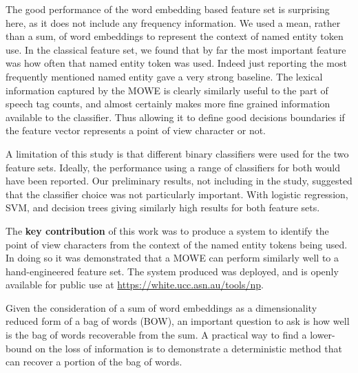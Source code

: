 \documentclass{book}
\begin{document}
The good performance of the word embedding based feature set is surprising here, as it does not include any frequency information.
We used a mean, rather than a sum, of word embeddings to represent the context of named entity token use.
In the classical feature set, we found that by far the most important feature was how often that named entity token was used.
Indeed just reporting the most frequently mentioned named entity gave a very strong baseline.
The lexical information captured by the MOWE is clearly similarly useful to the part of speech tag counts, and almost certainly makes more fine grained information available to the classifier.
Thus allowing it to define good decisions boundaries if the feature vector represents a point of view character or not.


A limitation of this study is that different binary classifiers were used for the two feature sets.
Ideally, the performance using a range of classifiers for both would have been reported.
Our preliminary results, not including in the study, suggested that the classifier choice was not particularly important.
With logistic regression, SVM, and decision trees giving similarly high results for both feature sets.
 



The \textbf{key contribution} of this work was to produce a system to identify the point of view characters from the context of the named entity tokens being used.
In doing so it was demonstrated that a MOWE can perform similarly well to a hand-engineered feature set.
The system produced was deployed, and is openly available for public use at \url{https://white.ucc.asn.au/tools/np}.


Given the consideration of a sum of word embeddings as a dimensionality reduced form of a bag of words (BOW),
an important question to ask is how well is the bag of words recoverable from the sum.
A practical way to find a lower-bound  on the loss of information
is to demonstrate a deterministic method that can recover a portion of the bag of words.
\end{document}
